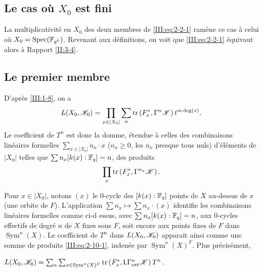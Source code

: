 \subsection{Le cas o\`u $X_0$ est fini}\label{III:2-9}

La multiplicativit\'e en $X_0$ des deux membres de \eqref{III:eq:2-2-1} 
ram\`ene ce cas \`a celui o\`u $X_0=\operatorname{Spec}(\mathbb{F}_{q^k})$. Revenant aux 
d\'efinitions, on voit que \eqref{III:eq:2-2-1} \'equivaut alors \`a 
Rapport \ref{II:3-4}. 





\subsection{Le premier membre}\label{III:2-10}

D'apr\`es \ref{III:1-8}, on a 
\[
  L(X_0,\mathscr{K}_0) = \prod_{x\in |X_0|} \sum_n \operatorname{tr}\left(F_x^*,\Gamma^n\mathscr{K}\right) t^{m\deg(x)} \text{.}
\]
Le coefficient de $T^n$ est donc la domme, \'etendue \`a celles des 
combinaisons lin\'eaires formelles $\sum_{x\in |X_0|} n_x\cdot x$ 
($n_x\geqslant 0$, les $n_x$ presque tous nuls) d'\'el\'ements de $|X_0|$ 
telles que $\sum n_x [k(x):\mathbb{F}_q] = n$, des produits 
\begin{equation}\label{III:eq:2-10-1}
  \prod_x \operatorname{tr}\left(F_x^*,\Gamma^{n_x} \mathscr{K}\right) \text{.}
\end{equation}

Pour $x\in |X_0|$, notons $(x)$ le $0$-cycle des $[k(x):\mathbb{F}_q]$ points de $X$ 
au-dessus de $x$ (une orbite de $F$). L'application 
$\sum n_x\mapsto \sum n_x\cdot (x)$ identifie les combinaisons lin\'eaires 
formelles comme ci-d
essus, avec $\sum n_x [k(x):\mathbb{F}_q]=n$, aux $0$-cycles effectifs de degr\'e $n$ 
de $X$ fixes sous $F$, soit encore aux points fixes de $F$ dans 
$\operatorname{Sym}^n(X)$. Le coefficient de $T^n$ dans $L(X_0,\mathscr{K}_0)$ 
apparait ainsi comme une somme de produits \eqref{III:eq:2-10-1}, inden\'ee 
par $\operatorname{Sym}^n(X)^F$. Plus pr\'ecis\'ement, 





\begin{lemma_}\label{III:2-11}
 $L(X_0,\mathscr{K}_0) = \sum_n \sum_{x\in\operatorname{Sym}^n(X)^F} \operatorname{tr}\left(F_x^*,\mathsf{L}\Gamma_\textnormal{ext}^n \mathscr{K}\right) T^n$.
\end{lemma_}

